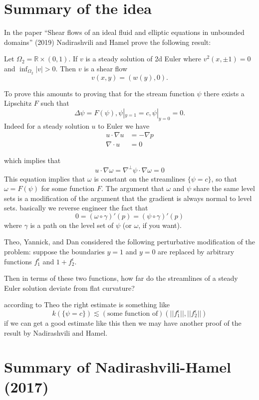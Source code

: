 \section{Summary of the idea}

In the paper ``Shear flows of an ideal fluid and elliptic equations in unbounded domains'' (2019) Nadirashvili and Hamel prove the following result:

\begin{theorem}
    Let $\Omega_2 = \mathbb{R} \times (0, 1)$. If $v$ is a steady solution of 2d Euler where $v^2(x, \pm 1) = 0$ and $\inf_{\Omega_2}|v| > 0$. Then $v$ is a shear flow
    \[v(x, y) = (w(y), 0).\]
\end{theorem}

To prove this amounts to proving that for the stream function $\psi$ there exists a Lipschitz $F$ such that 
\[\Delta \psi = F(\psi), \psi|_{y = 1} = c, \psi|_{y = 0} = 0.\] Indeed for a steady solution $u$ to Euler we have
\begin{align*}
    u \cdot \nabla u &= -\nabla p \\
    \nabla \cdot u &= 0
\end{align*}

which implies that 
\[u \cdot \nabla \omega = \nabla^{\perp}\psi \cdot \nabla \omega = 0\]
This equation implies that $\omega$ is constant on the streamlines $\{\psi = c\}$, so that $\omega = F(\psi)$ for some function $F$. The argument that $\omega$ and $\psi$ share the same level sets is a modification of the argument that the gradient is always normal to level sets. basically we reverse engineer the fact that 
\[0 = (\omega \circ \gamma)'(p) = (\psi \circ \gamma)'(p)\]
where $\gamma$ is a path on the level set of $\psi$ (or $\omega$, if you want).

Theo, Yannick, and Dan considered the following perturbative modification of the problem: suppose the boundaries $y = 1$ and $y = 0$ are replaced by arbitrary functions $f_1^\epsilon$ and $1 + f_2^\epsilon$.

Then in terms of these two functions, how far do the streamlines of a steady Euler solution deviate from flat curvature?

according to Theo the right estimate is something like
\[k(\{\psi = c\}) \lesssim (\text{some function of})(||f_1^\epsilon||, ||f_2^\epsilon||)\]
if we can get a good estimate like this then we may have another proof of the result by Nadirashvili and Hamel.

\section{Summary of Nadirashvili-Hamel (2017)}

